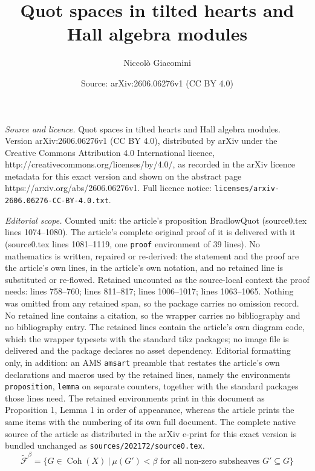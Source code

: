 \documentclass[10pt,a4paper]{amsart}
\title{Quot spaces in tilted hearts and Hall algebra modules}
\author{Niccol\`o Giacomini}
\date{Source: arXiv:2606.06276v1 (CC BY 4.0)}
\begin{document}
\maketitle

\noindent\emph{Source and licence.} Quot spaces in tilted hearts and Hall algebra modules. Version arXiv:2606.06276v1 (CC BY 4.0), distributed by arXiv under the Creative Commons Attribution 4.0 International licence, http://creativecommons.org/licenses/by/4.0/, as recorded in the arXiv licence metadata for this exact version and shown on the abstract page https://arxiv.org/abs/2606.06276v1. Full licence notice: \texttt{licenses/arxiv-2606.06276-CC-BY-4.0.txt}.\par\smallskip

\noindent\textit{Editorial scope.} Counted unit: the article's proposition BradlowQuot (source0.tex lines 1074--1080). The article's complete original proof of it is delivered with it (source0.tex lines 1081--1119, one \texttt{proof} environment of 39 lines). No mathematics is written, repaired or re-derived: the statement and the proof are the article's own lines, in the article's own notation, and no retained line is substituted or re-flowed.  Retained uncounted as the source-local context the proof needs: lines 758--760; lines 811--817; lines 1006--1017; lines 1063--1065.  Nothing was omitted from any retained span, so the package carries no omission record.  No retained line contains a citation, so the wrapper carries no bibliography and no bibliography entry.  The retained lines contain the article's own diagram code, which the wrapper typesets with the standard tikz packages; no image file is delivered and the package declares no asset dependency.  Editorial formatting only, in addition: an AMS \texttt{amsart} preamble that restates the article's own declarations and macros used by the retained lines, namely the environments \texttt{proposition}, \texttt{lemma} on separate counters, together with the standard packages those lines need.  The retained environments print in this document as Proposition 1, Lemma 1 in order of appearance, whereas the article prints the same items with the numbering of its own full document.  The complete native source of the article as distributed in the arXiv e-print for this exact version is bundled unchanged as \texttt{sources/202172/source0.tex}.
\begin{equation}\label{eqn : tweaked tp}
    \widetilde{\mathcal{F}}^{\beta}=\{ G\in \operatorname{Coh}(X) \ |\ \mu(G')< \beta \text{ for all non-zero subsheaves } G'\subseteq G \} 
\end{equation}
\end{document}
